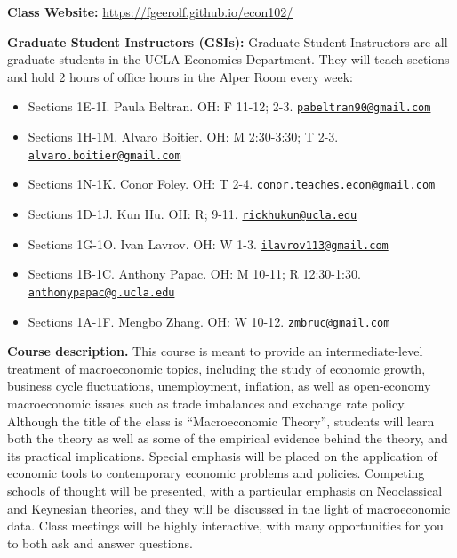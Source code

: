 \documentclass[]{book}
\providecommand{\tightlist}{%
  \setlength{\itemsep}{0pt}\setlength{\parskip}{0pt}}
\theoremstyle{definition}
\theoremstyle{definition}
\theoremstyle{definition}
\theoremstyle{remark}
\begin{document}
\textbf{Class Website:} \url{https://fgeerolf.github.io/econ102/}

\textbf{Graduate Student Instructors (GSIs):} Graduate Student
Instructors are all graduate students in the UCLA Economics Department.
They will teach sections and hold 2 hours of office hours in the Alper
Room every week:

\begin{itemize}
\tightlist
\item
  Sections 1E-1I. Paula Beltran. OH: F 11-12; 2-3.
  \href{mailto:pabeltran90@gmail.com}{\nolinkurl{pabeltran90@gmail.com}}
\item
  Sections 1H-1M. Alvaro Boitier. OH: M 2:30-3:30; T 2-3.
  \href{mailto:alvaro.boitier@gmail.com}{\nolinkurl{alvaro.boitier@gmail.com}}
\item
  Sections 1N-1K. Conor Foley. OH: T 2-4.
  \href{mailto:conor.teaches.econ@gmail.com}{\nolinkurl{conor.teaches.econ@gmail.com}}
\item
  Sections 1D-1J. Kun Hu. OH: R; 9-11.
  \href{mailto:rickhukun@ucla.edu}{\nolinkurl{rickhukun@ucla.edu}}
\item
  Sections 1G-1O. Ivan Lavrov. OH: W 1-3.
  \href{mailto:ilavrov113@gmail.com}{\nolinkurl{ilavrov113@gmail.com}}
\item
  Sections 1B-1C. Anthony Papac. OH: M 10-11; R 12:30-1:30.
  \href{mailto:anthonypapac@g.ucla.edu}{\nolinkurl{anthonypapac@g.ucla.edu}}
\item
  Sections 1A-1F. Mengbo Zhang. OH: W 10-12.
  \href{mailto:zmbruc@gmail.com}{\nolinkurl{zmbruc@gmail.com}}
\end{itemize}

\textbf{Course description.} This course is meant to provide an
intermediate-level treatment of macroeconomic topics, including the
study of economic growth, business cycle fluctuations, unemployment,
inflation, as well as open-economy macroeconomic issues such as trade
imbalances and exchange rate policy. Although the title of the class is
``Macroeconomic Theory'', students will learn both the theory as well as
some of the empirical evidence behind the theory, and its practical
implications. Special emphasis will be placed on the application of
economic tools to contemporary economic problems and policies. Competing
schools of thought will be presented, with a particular emphasis on
Neoclassical and Keynesian theories, and they will be discussed in the
light of macroeconomic data. Class meetings will be highly interactive,
with many opportunities for you to both ask and answer questions.
\end{document}
